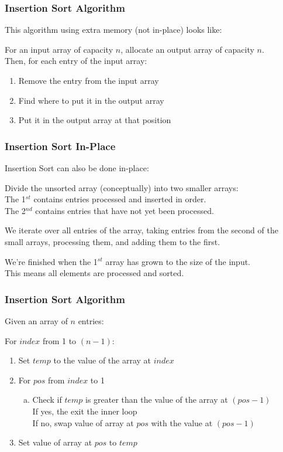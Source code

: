 \begin{frame}
\frametitle{Insertion Sort Algorithm}
This algorithm using extra memory (not in-place) looks like:

For an input array of capacity $n$, allocate an output array of capacity $n$.\\
Then, for each entry of the input array:

\begin{enumerate}
	\item Remove the entry from the input array
	\item Find where to put it in the output array
	\item Put it in the output array at that position
\end{enumerate}

\end{frame}

\begin{frame}
\frametitle{Insertion Sort In-Place}

Insertion Sort can also be done in-place:

Divide the unsorted array (conceptually) into two smaller arrays:\\
\quad The 1$^{st}$ contains entries processed and inserted in order.\\
\quad The 2$^{nd}$ contains entries that have not yet been processed.

We iterate over all entries of the array, taking entries from the second of the small arrays, processing them, and adding them to the first.

We're finished when the 1$^{st}$ array has grown to the size of the input.\\
\quad This means all elements are processed and sorted.

\end{frame}


\begin{frame}
\frametitle{Insertion Sort Algorithm}
Given an array of $n$ entries:

For $index$ from 1 to $(n-1)$:
\begin{enumerate}
	\item Set $temp$ to the value of the array at $index$
	\item For $pos$ from $index$ to 1
		\begin{enumerate}[a)]
			\item Check if $temp$ is greater than the value of the array at $(pos-1)$\\
			\quad\quad\quad If yes, the exit the inner loop\\
			\quad\quad\quad If no, swap value of array at $pos$ with the value at $(pos-1)$
		\end{enumerate}
	\item Set value of array at $pos$ to $temp$
\end{enumerate}

\end{frame}


